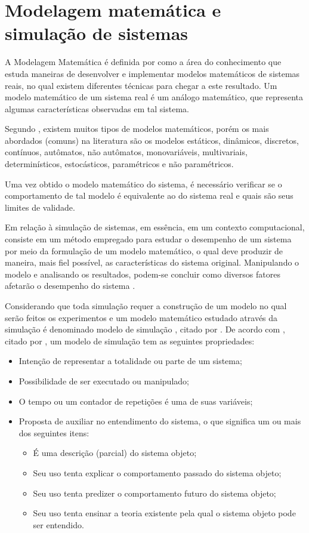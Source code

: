 \section{Modelagem matemática e simulação de sistemas}
\par
A Modelagem Matemática é definida por \cite{AGU07} como a área do conhecimento que estuda maneiras de desenvolver e implementar modelos matemáticos de sistemas reais, no qual existem diferentes técnicas para chegar a este resultado. Um modelo matemático de um sistema real é um análogo matemático, que representa algumas características observadas em tal sistema.
\par
Segundo \cite{AGU07}, existem muitos tipos de modelos matemáticos, porém os mais abordados (comuns) na literatura são os modelos estáticos, dinâmicos, discretos, contínuos, autômatos, não autômatos, monovariáveis, multivariais, determinísticos, estocásticos, paramétricos e não paramétricos.
\par
Uma vez obtido o modelo matemático do sistema, é necessário verificar se o comportamento de tal modelo é equivalente ao do sistema real e quais são seus limites de validade.
\par
Em relação à simulação de sistemas, em essência, em um contexto computacional, consiste em um método empregado para estudar o desempenho de um sistema por meio da formulação de um modelo matemático, o qual deve produzir de maneira, mais fiel possível, as características do sistema original. Manipulando o modelo e analisando os resultados, podem-se concluir como diversos fatores afetarão o desempenho do sistema \citep{HER63}.
\par
Considerando que toda simulação requer a construção de um modelo no qual serão feitos os experimentos e um modelo matemático estudado através da simulação é denominado modelo de simulação \cite{SAL89}, citado por \cite{GAV03}. De acordo com \cite{BAR70}, citado por \cite{GAV03}, um modelo de simulação tem as seguintes propriedades:
\begin{itemize}
\item Intenção de representar a totalidade ou parte de um sistema;
\item Possibilidade de ser executado ou manipulado;
\item O tempo ou um contador de repetições é uma de suas variáveis;
\item Proposta de auxiliar no entendimento do sistema, o que significa um ou mais dos seguintes itens:
\begin{itemize}
\item É uma descrição (parcial) do sistema objeto;
\item Seu uso tenta explicar o comportamento passado do sistema objeto;
\item Seu uso tenta predizer o comportamento futuro do sistema objeto;
\item Seu uso tenta ensinar a teoria existente pela qual o sistema objeto pode ser entendido.
\end{itemize}
\end{itemize}

